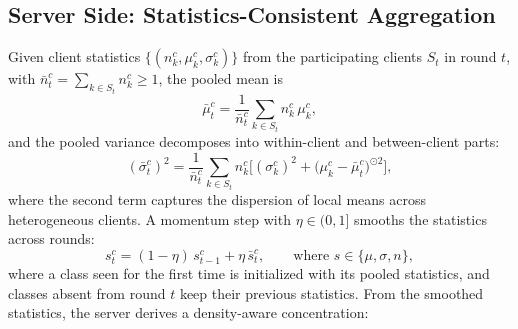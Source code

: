 \subsection{Server Side: Statistics-Consistent Aggregation}
\label{sec:server}

Given client statistics $\{(n_k^c,\mu_k^c,\sigma_k^c)\}$ from the participating clients $S_t$ in round $t$, with $\bar n_t^c=\sum_{k\in S_t}n_k^c\ge 1$, the pooled mean is
\begin{equation}
\bar\mu_t^c=\frac{1}{\bar n_t^c}\sum_{k\in S_t}n_k^c\,\mu_k^c, \label{eq:server_mean}
\end{equation}
and the pooled variance decomposes into within-client and between-client parts:
\begin{equation}
(\bar\sigma_t^c)^2=\frac{1}{\bar n_t^c}\sum_{k\in S_t}n_k^c\Big[(\sigma_k^c)^2+\big(\mu_k^c-\bar\mu_t^c\big)^{\odot 2}\Big], \label{eq:server_var}
\end{equation}
where the second term captures the dispersion of local means across heterogeneous clients. A momentum step with $\eta\in(0,1]$ smooths the statistics across rounds:
\begin{equation}
s_t^c=(1-\eta)\,s_{t-1}^c+\eta\,\bar s_t^c,\qquad\text{where } s\in\{\mu,\sigma,n\},
\label{eq:server_mom}
\end{equation}
where a class seen for the first time is initialized with its pooled statistics, and classes absent from round $t$ keep their previous statistics. From the smoothed statistics, the server derives a density-aware concentration:
